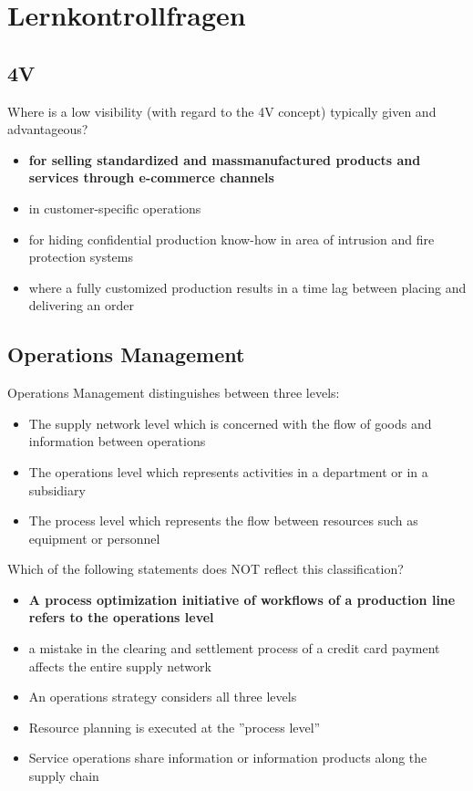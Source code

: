 \section{Lernkontrollfragen}
\subsection{4V}
Where is a low visibility (with regard to the 4V concept) typically given and advantageous?
\begin{itemize}
	\item \textbf{for selling standardized and massmanufactured products and services through e-commerce channels}
	\item in customer-specific operations
	\item for hiding confidential production know-how in area of intrusion and fire protection systems 
	\item where a fully customized production results in a time lag between placing and delivering an order
\end{itemize}
\subsection{Operations Management}
Operations Management distinguishes between three levels:
\begin{itemize}
\item The supply network level which is concerned with the flow of goods and information between operations
\item The operations level which represents activities in a department or in a subsidiary
\item The process level which represents the flow between resources such as equipment or personnel
\end{itemize}
Which of the following statements does NOT reflect this classification?
\begin{itemize}
	\item \textbf{A process optimization initiative of workflows of a production line refers to the operations level}
	\item a mistake in the clearing and settlement process of a credit card payment affects the entire supply network
	\item An operations strategy considers all three levels
	\item Resource planning is executed at the ''process level''
	\item Service operations share information or information products along the supply chain
\end{itemize}
